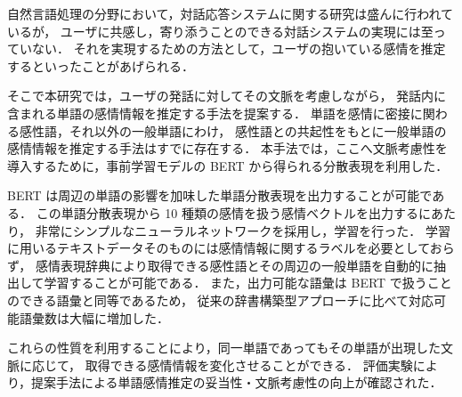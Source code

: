 \abstract
自然言語処理の分野において，対話応答システムに関する研究は盛んに行われているが，
ユーザに共感し，寄り添うことのできる対話システムの実現には至っていない．
それを実現するための方法として，ユーザの抱いている感情を推定するといったことがあげられる．

そこで本研究では，ユーザの発話に対してその文脈を考慮しながら，
発話内に含まれる単語の感情情報を推定する手法を提案する．
単語を感情に密接に関わる感性語，それ以外の一般単語にわけ，
感性語との共起性をもとに一般単語の感情情報を推定する手法はすでに存在する．
本手法では，ここへ文脈考慮性を導入するために，事前学習モデルの BERT から得られる分散表現を利用した．

BERT は周辺の単語の影響を加味した単語分散表現を出力することが可能である．
この単語分散表現から 10 種類の感情を扱う感情ベクトルを出力するにあたり，
非常にシンプルなニューラルネットワークを採用し，学習を行った．
学習に用いるテキストデータそのものには感情情報に関するラベルを必要としておらず，
感情表現辞典により取得できる感性語とその周辺の一般単語を自動的に抽出して学習することが可能である．
また，出力可能な語彙は BERT で扱うことのできる語彙と同等であるため，
従来の辞書構築型アプローチに比べて対応可能語彙数は大幅に増加した．

これらの性質を利用することにより，同一単語であってもその単語が出現した文脈に応じて，
取得できる感情情報を変化させることができる．
評価実験により，提案手法による単語感情推定の妥当性・文脈考慮性の向上が確認された．

